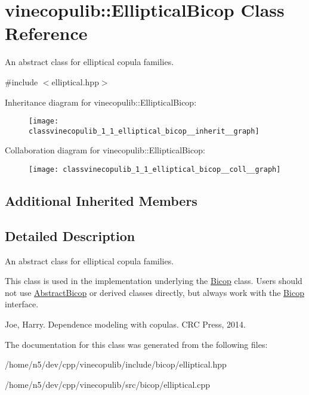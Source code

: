 \hypertarget{classvinecopulib_1_1_elliptical_bicop}{}\section{vinecopulib\+:\+:Elliptical\+Bicop Class Reference}
\label{classvinecopulib_1_1_elliptical_bicop}


An abstract class for elliptical copula families.  




{\ttfamily \#include $<$elliptical.\+hpp$>$}



Inheritance diagram for vinecopulib\+:\+:Elliptical\+Bicop\+:\nopagebreak
\begin{figure}[H]
\begin{center}
\leavevmode
\texttt{[image: classvinecopulib\_1\_1\_elliptical\_bicop\_\_inherit\_\_graph]}
\end{center}
\end{figure}


Collaboration diagram for vinecopulib\+:\+:Elliptical\+Bicop\+:\nopagebreak
\begin{figure}[H]
\begin{center}
\leavevmode
\texttt{[image: classvinecopulib\_1\_1\_elliptical\_bicop\_\_coll\_\_graph]}
\end{center}
\end{figure}
\subsection*{Additional Inherited Members}


\subsection{Detailed Description}
An abstract class for elliptical copula families. 

This class is used in the implementation underlying the \hyperlink{classvinecopulib_1_1_bicop}{Bicop} class. Users should not use \hyperlink{classvinecopulib_1_1_abstract_bicop}{Abstract\+Bicop} or derived classes directly, but always work with the \hyperlink{classvinecopulib_1_1_bicop}{Bicop} interface.

Joe, Harry. Dependence modeling with copulas. C\+RC Press, 2014. 

The documentation for this class was generated from the following files\+:\begin{DoxyCompactItemize}
\item 
/home/n5/dev/cpp/vinecopulib/include/bicop/elliptical.\+hpp\item 
/home/n5/dev/cpp/vinecopulib/src/bicop/elliptical.\+cpp\end{DoxyCompactItemize}
